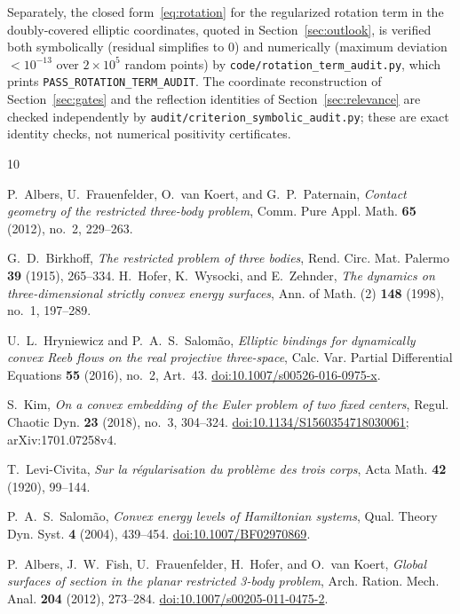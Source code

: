 \documentclass[11pt,reqno]{amsart}
\theoremstyle{plain}
\theoremstyle{definition}
\begin{document}
Separately, the closed form~\eqref{eq:rotation} for the regularized rotation term in the doubly-covered elliptic coordinates, quoted in Section~\ref{sec:outlook}, is verified both symbolically (residual simplifies to $0$) and numerically (maximum deviation $<10^{-13}$ over $2\times10^5$ random points) by \texttt{code/rotation\_term\_audit.py}, which prints \texttt{PASS\_ROTATION\_TERM\_AUDIT}. The coordinate reconstruction of Section~\ref{sec:gates} and the reflection identities of Section~\ref{sec:relevance} are checked independently by \texttt{audit/criterion\_symbolic\_audit.py}; these are exact identity checks, not numerical positivity certificates.

\begin{thebibliography}{10}

P.~Albers, U.~Frauenfelder, O.~van Koert, and G.~P.~Paternain,
\emph{Contact geometry of the restricted three-body problem},
Comm. Pure Appl. Math. \textbf{65} (2012), no.~2, 229--263.

G.~D.~Birkhoff,
\emph{The restricted problem of three bodies},
Rend. Circ. Mat. Palermo \textbf{39} (1915), 265--334.
H.~Hofer, K.~Wysocki, and E.~Zehnder,
\emph{The dynamics on three-dimensional strictly convex energy surfaces},
Ann. of Math. (2) \textbf{148} (1998), no.~1, 197--289.

U.~L.~Hryniewicz and P.~A.~S.~Salom\~ao,
\emph{Elliptic bindings for dynamically convex Reeb flows on the real projective three-space},
Calc. Var. Partial Differential Equations \textbf{55} (2016), no.~2, Art.~43.
\href{https://doi.org/10.1007/s00526-016-0975-x}{doi:10.1007/s00526-016-0975-x}.

S.~Kim,
\emph{On a convex embedding of the Euler problem of two fixed centers},
Regul. Chaotic Dyn. \textbf{23} (2018), no.~3, 304--324.\newline
\href{https://doi.org/10.1134/S1560354718030061}{doi:10.1134/S1560354718030061}; arXiv:1701.07258v4.

T.~Levi-Civita,
\emph{Sur la r\'egularisation du probl\`eme des trois corps},
Acta Math. \textbf{42} (1920), 99--144.

P.~A.~S.~Salom\~ao,
\emph{Convex energy levels of Hamiltonian systems},
Qual. Theory Dyn. Syst. \textbf{4} (2004), 439--454.
\href{https://doi.org/10.1007/BF02970869}{doi:10.1007/BF02970869}.

P.~Albers, J.~W.~Fish, U.~Frauenfelder, H.~Hofer, and O.~van Koert,
\emph{Global surfaces of section in the planar restricted 3-body problem},
Arch. Ration. Mech. Anal. \textbf{204} (2012), 273--284.
\href{https://doi.org/10.1007/s00205-011-0475-2}{doi:10.1007/s00205-011-0475-2}.


\end{thebibliography}
\end{document}
